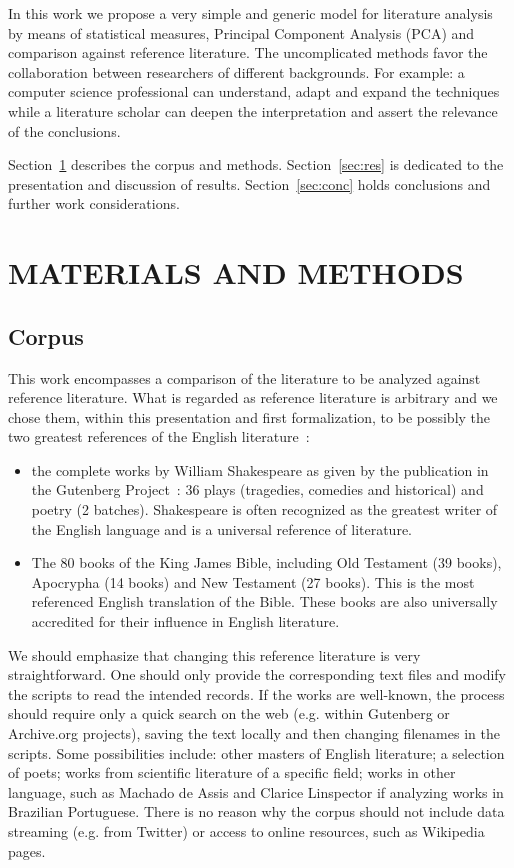 \documentclass[12pt,fleqn]{article}
\begin{document}
In this work we propose a very simple and generic model for literature analysis
by means of statistical measures, Principal Component Analysis (PCA) and comparison against
reference literature.
The uncomplicated methods favor the collaboration between researchers of different backgrounds.
For example: a computer science professional can understand, adapt and expand the techniques
while a literature scholar can deepen the interpretation and assert the relevance of the conclusions.

Section~\ref{sec:matMet} describes the corpus and methods.
Section~\ref{sec:res} is dedicated to the presentation and discussion of results.
Section~\ref{sec:conc} holds conclusions and further work considerations.

\section{MATERIALS AND METHODS}\label{sec:matMet}
\subsection{Corpus}
This work encompasses a comparison of the literature to be analyzed against
reference literature.
What is regarded as reference literature is arbitrary and we chose them,
within this presentation and first formalization, to be
possibly the two greatest references of the English literature~\citep{bib,shake}:

\begin{itemize}
    \item the complete works by William Shakespeare as given by the
        publication in the Gutenberg Project~\citep{shakWhole}:
        36 plays (tragedies, comedies and historical) and poetry (2 batches).
        Shakespeare is often recognized as the greatest writer of the English language
        and is a universal reference of literature.
    \item The 80 books of the King James Bible, including Old Testament (39 books),
        Apocrypha (14 books) and New Testament (27 books).
        This is the most referenced English translation of the Bible.
        These books are also universally accredited for their influence in English literature.
\end{itemize}

We should emphasize that changing this reference literature is very straightforward.
One should only provide the corresponding text files and modify the scripts to read the
intended records.
If the works are well-known, the process should require only a quick search on the web
(e.g. within Gutenberg or Archive.org projects), saving the text locally and then changing
filenames in the scripts.
Some possibilities include: other masters of English literature;
a selection of poets; works from scientific literature of a specific field;
works in other language, such as Machado de Assis and Clarice Linspector
if analyzing works in Brazilian Portuguese.
There is no reason why the corpus should not include data streaming (e.g. from Twitter)
or access to online resources,
such as Wikipedia pages.
\end{document}
